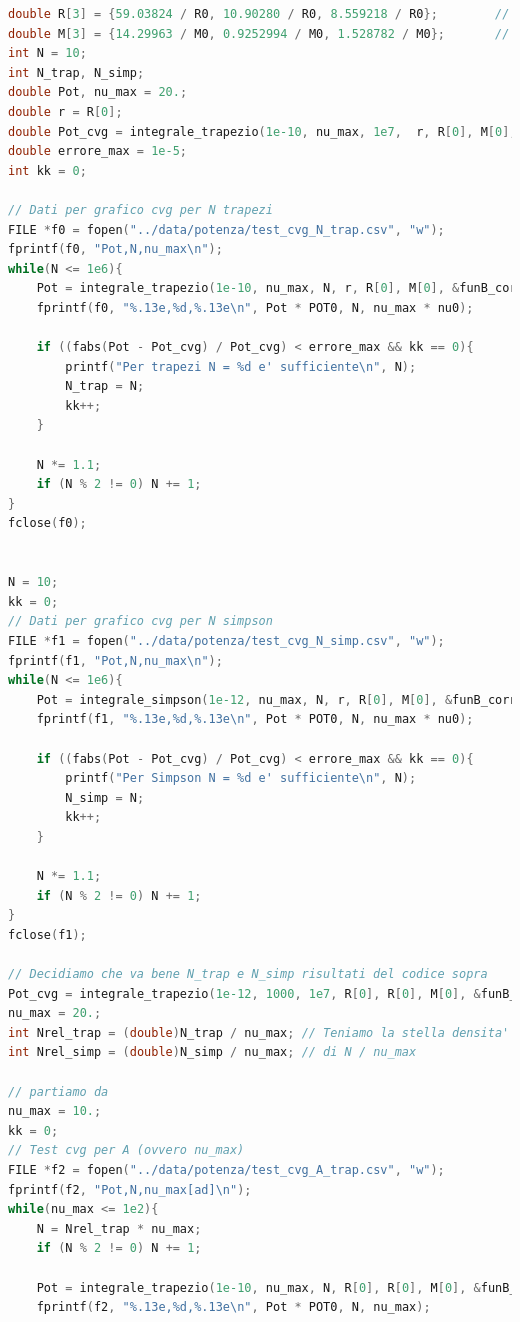\documentclass[a4paper, titlepage]{article}
\begin{document}
\begin{lstlisting}[language=C]
double R[3] = {59.03824 / R0, 10.90280 / R0, 8.559218 / R0};        // Raggi delle 3 stelle
double M[3] = {14.29963 / M0, 0.9252994 / M0, 1.528782 / M0};       // Masse delle 3 stelle
int N = 10;
int N_trap, N_simp;
double Pot, nu_max = 20.;
double r = R[0];
double Pot_cvg = integrale_trapezio(1e-10, nu_max, 1e7,  r, R[0], M[0], &funB_corrected); // Aggiunto dopo, e' quello ottenuto con N = 1e6
double errore_max = 1e-5;
int kk = 0;

// Dati per grafico cvg per N trapezi
FILE *f0 = fopen("../data/potenza/test_cvg_N_trap.csv", "w");
fprintf(f0, "Pot,N,nu_max\n");
while(N <= 1e6){
    Pot = integrale_trapezio(1e-10, nu_max, N, r, R[0], M[0], &funB_corrected);
    fprintf(f0, "%.13e,%d,%.13e\n", Pot * POT0, N, nu_max * nu0);

    if ((fabs(Pot - Pot_cvg) / Pot_cvg) < errore_max && kk == 0){
        printf("Per trapezi N = %d e' sufficiente\n", N);
        N_trap = N;
        kk++;
    }

    N *= 1.1;
    if (N % 2 != 0) N += 1;
}
fclose(f0);


N = 10;
kk = 0;
// Dati per grafico cvg per N simpson
FILE *f1 = fopen("../data/potenza/test_cvg_N_simp.csv", "w");
fprintf(f1, "Pot,N,nu_max\n");
while(N <= 1e6){
    Pot = integrale_simpson(1e-12, nu_max, N, r, R[0], M[0], &funB_corrected);
    fprintf(f1, "%.13e,%d,%.13e\n", Pot * POT0, N, nu_max * nu0);

    if ((fabs(Pot - Pot_cvg) / Pot_cvg) < errore_max && kk == 0){
        printf("Per Simpson N = %d e' sufficiente\n", N);
        N_simp = N;
        kk++;
    }

    N *= 1.1;
    if (N % 2 != 0) N += 1;
}
fclose(f1);

// Decidiamo che va bene N_trap e N_simp risultati del codice sopra
Pot_cvg = integrale_trapezio(1e-12, 1000, 1e7, R[0], R[0], M[0], &funB_corrected);
nu_max = 20.;
int Nrel_trap = (double)N_trap / nu_max; // Teniamo la stella densita'
int Nrel_simp = (double)N_simp / nu_max; // di N / nu_max

// partiamo da
nu_max = 10.;
kk = 0;
// Test cvg per A (ovvero nu_max)
FILE *f2 = fopen("../data/potenza/test_cvg_A_trap.csv", "w");
fprintf(f2, "Pot,N,nu_max[ad]\n");
while(nu_max <= 1e2){
    N = Nrel_trap * nu_max;
    if (N % 2 != 0) N += 1;

    Pot = integrale_trapezio(1e-10, nu_max, N, R[0], R[0], M[0], &funB_corrected);
    fprintf(f2, "%.13e,%d,%.13e\n", Pot * POT0, N, nu_max);


\end{lstlisting}
\end{document}
